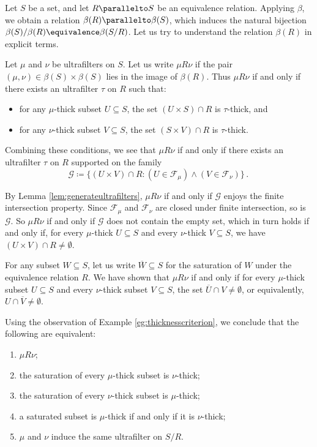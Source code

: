 \begin{eg}
	Let $ S $ be a set, and let $ R \parallelto S $
	be an equivalence relation.
	Applying $ \beta $, we obtain a relation
	$ \beta(R) \parallelto \beta(S) $, which induces
	the natural bijection
	$ \beta(S)/\beta(R) \equivalence \beta(S/R) $.
	Let us try to understand the relation $ \beta(R) $
	in explicit terms.
	
	Let $ \mu $ and $ \nu $ be ultrafilters on $ S $.
	Let us write $ \mu R \nu $ if
	the pair $ (\mu, \nu) \in \beta(S) \times \beta(S) $
	lies in the image of $ \beta(R) $.
	Thus $ \mu R \nu $ if and only if
	there exists an ultrafilter $ \tau $ on $ R $
	such that:
	\begin{itemize}
		\item for any $ \mu $-thick subset $ U \subseteq S $,
			the set $ (U \times S) \cap R $
			is $ \tau $-thick, and
		\item for any $ \nu $-thick subset $ V \subseteq S $,
			the set $ (S \times V) \cap R $
			is $ \tau $-thick.
	\end{itemize}
	Combining these conditions, we see that
	$ \mu R \nu $ if and only if
	there exists an ultrafilter $ \tau $ on $ R $
	supported on the family
	\[
		\mathscr{G} \coloneq
			\{ (U \times V) \cap R :
			(U \in \mathscr{F}_{\mu})
			\wedge (V \in \mathscr{F}_{\nu}) \} \period
	\]
	
	By Lemma \ref{lem:generateultrafilters},
	$ \mu R \nu $ if and only if
	$ \mathscr{G} $ enjoys the finite intersection property.
	Since $ \mathscr{F}_{\mu} $ and $ \mathscr{F}_{\nu} $
	are closed under finite intersection,
	so is $ \mathscr{G} $.
	So $ \mu R \nu $ if and only if
	$ \mathscr{G} $ does not contain the empty set,
	which in turn holds if and only if,
	for every $ \mu $-thick $ U \subseteq S $ and
	every $ \nu $-thick $ V \subseteq S $,
	we have $ (U \times V) \cap R \neq \emptyset $.

	For any subset $ W \subseteq S $,
	let us write $ \overline{W} \subseteq S $
	for the saturation of $ W $
	under the equivalence relation $ R $.
	We have shown that $ \mu R \nu $ if and only if
	for every $ \mu $-thick subset $ U \subseteq S $
	and every $ \nu $-thick subset $ V \subseteq S $,
	the set $ \overline{U} \cap V \neq \emptyset $,
	or equivalently, $ U \cap \overline{V} \neq \emptyset $.

	Using the observation of Example \ref{eg:thicknesscriterion},
	we conclude that the following are equivalent:
	\begin{enumerate}
		\item $ \mu R \nu $;
		\item the saturation of every $ \mu $-thick subset
			is $ \nu $-thick;
		\item the saturation of every $ \nu $-thick subset
			is $ \mu $-thick;
		\item a saturated subset is $ \mu $-thick if and only if
			it is $ \nu $-thick;
		\item $ \mu $ and $ \nu $ induce the same ultrafilter
			on $ S/R $.
	\end{enumerate}
\end{eg}

